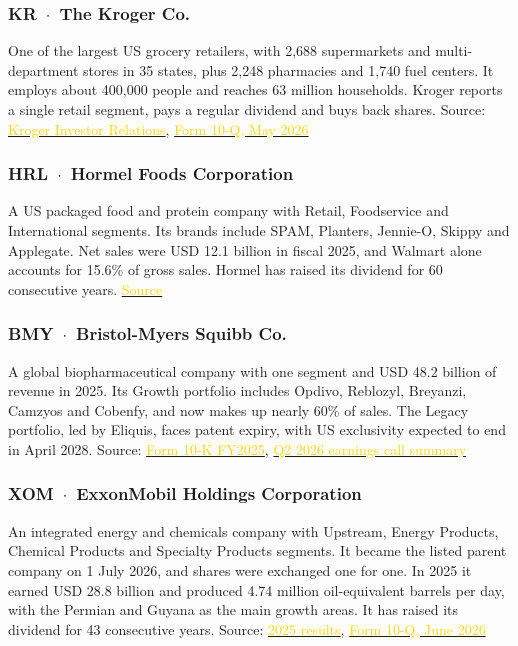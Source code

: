 \documentclass[10pt,a4paper]{article}
\begin{document}
\subsubsection*{KR \,$\cdot$\, The Kroger Co.}
One of the largest US grocery retailers, with 2,688 supermarkets and multi-department stores in 35 states, plus 2,248 pharmacies and 1,740 fuel centers. It employs about 400,000 people and reaches 63 million households. Kroger reports a single retail segment, pays a regular dividend and buys back shares.
Source: \href{https://ir.kroger.com/overview/default.aspx}{\textcolor{gold}{Kroger Investor Relations}}, \href{https://www.sec.gov/Archives/edgar/data/56873/000110465926078236/kr-20260523x10q.htm}{\textcolor{gold}{Form 10-Q, May 2026}}

\subsubsection*{HRL \,$\cdot$\, Hormel Foods Corporation}
A US packaged food and protein company with Retail, Foodservice and International segments. Its brands include SPAM, Planters, Jennie-O, Skippy and Applegate. Net sales were USD 12.1 billion in fiscal 2025, and Walmart alone accounts for 15.6\% of gross sales. Hormel has raised its dividend for 60 consecutive years.
\href{https://www.sec.gov/Archives/edgar/data/48465/000004846525000059/hrl-20251026.htm}{\textcolor{gold}{Source}}

\subsubsection*{BMY \,$\cdot$\, Bristol-Myers Squibb Co.}
A global biopharmaceutical company with one segment and USD 48.2 billion of revenue in 2025. Its Growth portfolio includes Opdivo, Reblozyl, Breyanzi, Camzyos and Cobenfy, and now makes up nearly 60\% of sales. The Legacy portfolio, led by Eliquis, faces patent expiry, with US exclusivity expected to end in April 2028.
Source: \href{https://www.sec.gov/Archives/edgar/data/14272/000001427226000004/bmy-20251231.htm}{\textcolor{gold}{Form 10-K FY2025}}, \href{https://www.gurufocus.com/news/8992331/bristolmyers-squibb-co-bmy-q2-2026-earnings-call-highlights-growth-portfolio-surges-14-guidance-raised-amid-pipeline-progress}{\textcolor{gold}{Q2 2026 earnings call summary}}

\subsubsection*{XOM \,$\cdot$\, ExxonMobil Holdings Corporation}
An integrated energy and chemicals company with Upstream, Energy Products, Chemical Products and Specialty Products segments. It became the listed parent company on 1 July 2026, and shares were exchanged one for one. In 2025 it earned USD 28.8 billion and produced 4.74 million oil-equivalent barrels per day, with the Permian and Guyana as the main growth areas. It has raised its dividend for 43 consecutive years.
Source: \href{https://corporate.exxonmobil.com/news/news-releases/2026/0130-exxonmobil-announces-2025-results}{\textcolor{gold}{2025 results}}, \href{https://www.sec.gov/Archives/edgar/data/0000034088/000003408826000093/xom-20260630.htm}{\textcolor{gold}{Form 10-Q, June 2026}}
\end{document}
